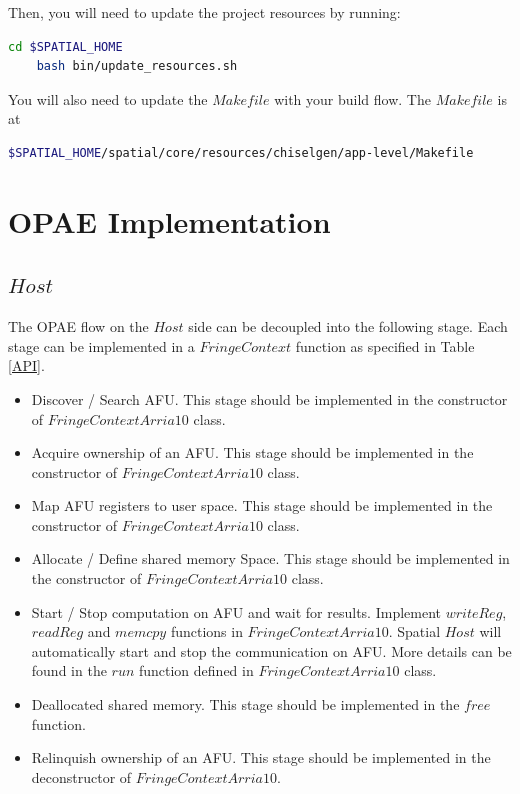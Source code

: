 \documentclass{article}
\begin{document}
    Then, you will need to update the project resources by running:
    \begin{lstlisting}[language=bash]
    cd $SPATIAL_HOME
    bash bin/update_resources.sh
    \end{lstlisting}
    
    You will also need to update the $Makefile$ with your build flow. The $Makefile$ is at
    \begin{lstlisting}[language=bash]
    $SPATIAL_HOME/spatial/core/resources/chiselgen/app-level/Makefile
    \end{lstlisting}
    
    \section{OPAE Implementation}
    \subsection{$Host$}
    The OPAE flow on the $Host$ side can be decoupled into the following stage.
    Each stage can be implemented in a $FringeContext$ function as specified in Table \ref{API}.
    \begin{itemize}
        \item Discover / Search AFU.
            This stage should be implemented in the constructor of $FringeContextArria10$ class.
        \item Acquire ownership of an AFU.
            This stage should be implemented in the constructor of $FringeContextArria10$ class.
        \item Map AFU registers to user space.
            This stage should be implemented in the constructor of $FringeContextArria10$ class.
        \item Allocate / Define shared memory Space.
            This stage should be implemented in the constructor of $FringeContextArria10$ class.
        \item Start / Stop computation on AFU and wait for results.
            Implement $writeReg$, $readReg$ and $memcpy$ functions in $FringeContextArria10$.
            Spatial $Host$ will automatically start and stop the communication on AFU.
            More details can be found in the $run$ function defined in $FringeContextArria10$ class.
        \item Deallocated shared memory.
            This stage should be implemented in the $free$ function.
        \item Relinquish ownership of an AFU.
            This stage should be implemented in the deconstructor of $FringeContextArria10$.
    \end{itemize}
    
\end{document}
